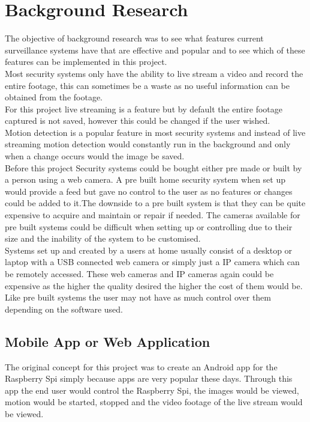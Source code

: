 \documentclass[12pt]{report}
\begin{document}
\section{Background Research}
\label{sec:research}

The objective of background research was to see what features current surveillance systems have that are effective and popular and to see which of these features can be implemented in this project.\\

Most security systems only have the ability to live stream a video and record the entire footage, this can sometimes be a waste as no useful information can be obtained from the footage.\\ 

For this project live streaming is a feature but by default the entire footage captured is not saved, however this could be changed if the user wished.\\

Motion detection is a popular feature in most security systems and instead of live streaming motion detection would constantly run in the background and only when a change occurs would the image be saved. \\

Before this project Security systems could be bought either pre made or built by a person using a web camera. A pre built home security system when set up would provide a feed but gave no control to the user as no features or changes could be added to it.The downside to a pre built system is that they can be quite expensive to acquire and maintain or repair if needed. The cameras available for pre built systems could be difficult when setting up or controlling due to their size and the inability of the system to be customised.\\

Systems set up and created by a users at home usually consist of a desktop or laptop with a USB connected web camera or simply just a IP camera which can be remotely accessed. These web cameras and IP cameras again could be expensive as the higher the quality desired the higher the cost of them would be. Like pre built systems the user may not have as much control over them depending on the software used.\\ 

\subsection{Mobile App or Web Application}
\label{subsec:Android}
The original concept for this project was to create an Android app for the Raspberry Spi simply because apps are very popular these days. Through this app the end user would control the Raspberry Spi, the images would be viewed, motion would be started, stopped and the video footage of the live stream would be viewed.\\
\end{document}
